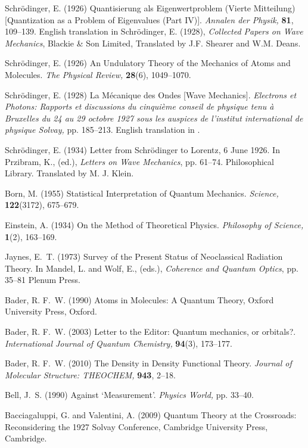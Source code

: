 \documentclass[onecolumn,secnumarabic,amsmath,amssymb,balancelastpage,nofootinbib]{article}
\begin{document}
\begin{thebibliography}{100}
Schr{\"o}dinger, E. (1926)
Quantisierung als Eigenwertproblem (Vierte Mitteilung) [Quantization as a
  Problem of Eigenvalues (Part IV)].
{\em Annalen der Physik,} {\bf 81}, 109--139.
English translation in Schr{\"o}dinger, E. (1928), \textit{Collected Papers on
  Wave Mechanics}, Blackie \& Son Limited, Translated by J.F. Shearer and W.M.
  Deans.

Schr{\"o}dinger, E. (1926)
An Undulatory Theory of the Mechanics of Atoms and Molecules.
{\em The Physical Review,} {\bf 28}(6), 1049--1070.

Schr{\"o}dinger, E. (1928)
La M\'{e}canique des Ondes [Wave Mechanics].
{\em Electrons et Photons: Rapports et discussions du cinqui\`{e}me conseil de
  physique tenu \`{a} Bruxelles du 24 au 29 octobre 1927 sous les auspices de
  l'institut international de physique Solvay,} pp. 185--213.
English translation in \cite{bacciagaluppi2009}.

Schr{\"o}dinger, E. (1934)
Letter from Schr{\"o}dinger to Lorentz, 6 June 1926.
In Przibram, K., (ed.), \emph{Letters on Wave Mechanics},  pp. 61--74.
  Philosophical Library.
Translated by M. J. Klein.

Born, M. (1955)
Statistical Interpretation of Quantum Mechanics.
{\em Science,} {\bf 122}(3172), 675--679.

Einstein, A. (1934)
On the Method of Theoretical Physics.
{\em Philosophy of Science,} {\bf 1}(2), 163--169.

Jaynes, E.~T. (1973)
Survey of the Present Status of Neoclassical Radiation Theory.
In Mandel, L. and Wolf, E., (eds.), \emph{Coherence and Quantum Optics},  pp.
  35--81 Plenum Press.

Bader, R. F.~W. (1990)
Atoms in Molecules: A Quantum Theory,
Oxford University Press, Oxford.

Bader, R. F.~W. (2003)
Letter to the Editor: Quantum mechanics, or orbitals?.
{\em International Journal of Quantum Chemistry,} {\bf 94}(3), 173--177.

Bader, R. F.~W. (2010)
The Density in Density Functional Theory.
{\em Journal of Molecular Structure: THEOCHEM,} {\bf 943}, 2--18.

Bell, J.~S. (1990)
Against `Measurement'.
{\em Physics World,} pp. 33--40.

Bacciagaluppi, G. and Valentini, A. (2009)
Quantum Theory at the Crossroads: Reconsidering the 1927 Solvay Conference,
Cambridge University Press, Cambridge.


\end{thebibliography}
\end{document}
